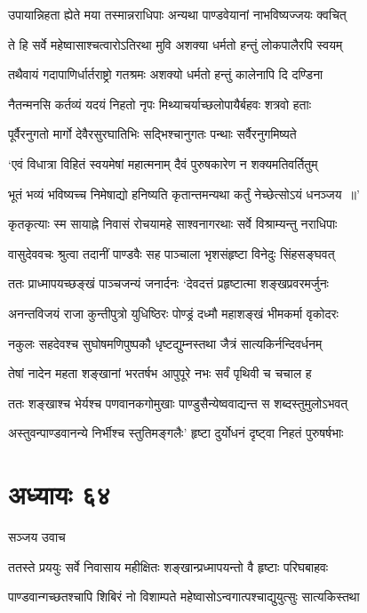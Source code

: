 \twolineshloka
{उपायान्निहता ह्येते मया तस्मान्नराधिपाः}
{अन्यथा पाण्डवेयानां नाभविष्यज्जयः क्वचित्}


\twolineshloka
{ते हि सर्वे महेष्वासाश्चत्वारोऽतिरथा मुवि}
{अशक्या धर्मतो हन्तुं लोकपालैरपि स्वयम्}


\twolineshloka
{तथैवायं गदापाणिर्धार्तराष्ट्रो गतश्रमः}
{अशक्यो धर्मतो हन्तुं कालेनापि दि दण्डिना}


\twolineshloka
{नैतन्मनसि कर्तव्यं यदयं निहतो नृपः}
{मिथ्याचर्याच्छलोपायैर्बहवः शत्रवो हताः}


\twolineshloka
{पूर्वैरनुगतो मार्गो देवैरसुरघातिभिः}
{सद्भिश्चानुगतः पन्थाः सर्वैरनुगमिष्यते}


\twolineshloka
{`एवं विधात्रा विहितं स्वयमेषां महात्मनाम्}
{दैवं पुरुषकारेण न शक्यमतिवर्तितुम्}


\twolineshloka
{भूतं भव्यं भविष्यच्च निमेषाद्यो हनिष्यति}
{कृतान्तमन्यथा कर्तुं नेच्छेत्सोऽयं धनञ्जय ॥'}


\twolineshloka
{कृतकृत्याः स्म सायाह्ने निवासं रोचयामहे}
{साश्वनागरथाः सर्वे विश्राम्यन्तु नराधिपाः}


\twolineshloka
{वासुदेववचः श्रुत्वा तदानीं पाण्डवैः सह}
{पाञ्चाला भृशसंहृष्टा विनेदुः सिंहसङ्घवत्}


\twolineshloka
{ततः प्राध्मापयच्छङ्खं पाञ्चजन्यं जनार्दनः}
{`देवदत्तं प्रहृष्टात्मा शङ्खप्रवरमर्जुनः}


\twolineshloka
{अनन्तविजयं राजा कुन्तीपुत्रो युधिष्ठिरः}
{पोण्ड्रं दध्मौ महाशङ्खं भीमकर्मा वृकोदरः}


\twolineshloka
{नकुलः सहदेवश्च सुघोषमणिपुष्पकौ}
{धृष्टद्युम्नस्तथा जैत्रं सात्यकिर्नन्दिवर्धनम्}


\twolineshloka
{तेषां नादेन महता शङ्खानां भरतर्षभ}
{आपुपूरे नभः सर्वं पृथिवी च चचाल ह}


\twolineshloka
{ततः शङ्खाश्च भेर्यश्च पणवानकगोमुखाः}
{पाण्डुसैन्येष्ववाद्यन्त स शब्दस्तुमुलोऽभवत्}


\twolineshloka
{अस्तुवन्पाण्डवानन्ये निर्भीश्च स्तुतिमङ्गलैः'}
{हृष्टा दुर्योधनं दृष्ट्वा निहतं पुरुषर्षभाः}


\chapter{अध्यायः ६४}
\twolineshloka
{सञ्जय उवाच}
{}


\twolineshloka
{ततस्ते प्रययुः सर्वे निवासाय महीक्षितः}
{शङ्खान्प्रध्मापयन्तो वै हृष्टाः परिघबाहवः}


\twolineshloka
{पाण्डवान्गच्छतश्चापि शिबिरं नो विशाम्पते}
{महेष्वासोऽन्वगात्पश्चाद्युयुत्सुः सात्यकिस्तथा}


